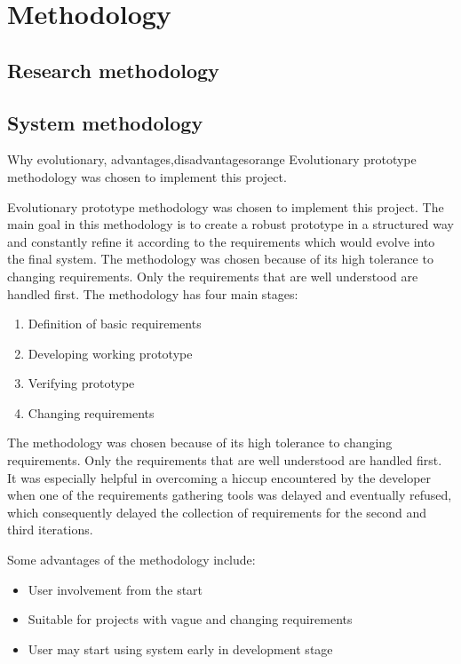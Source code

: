 \chapter{Methodology}
\section{Research methodology}

\section{System methodology}
\begin{review_comment}{Why evolutionary, advantages,disadvantages}{orange}
{Evolutionary prototype methodology was chosen to implement this project.}
\end{review_comment}

\noindent
Evolutionary prototype methodology was chosen to implement this project. The main goal in this methodology is to create a robust prototype in a structured way and constantly refine it according to the requirements which would evolve into the final system. The methodology was chosen because of its high tolerance to changing requirements. Only the requirements that are well understood are handled first. The methodology has four main stages:
\begin{enumerate}
\item Definition of basic requirements
\item Developing working prototype
\item Verifying prototype
\item Changing requirements
\end{enumerate}

\noindent
The methodology was chosen because of its high tolerance to changing requirements. Only the requirements that are well understood are handled first. It was especially helpful in overcoming a hiccup encountered by the developer when one of the requirements gathering tools was delayed and eventually refused, which consequently delayed the collection of requirements for the second and third iterations.

\noindent
Some advantages of the methodology include:
\begin{itemize}
\item User involvement from the start
\item Suitable for projects with vague and changing requirements
\item User may start using system early in development stage
\end{itemize}

